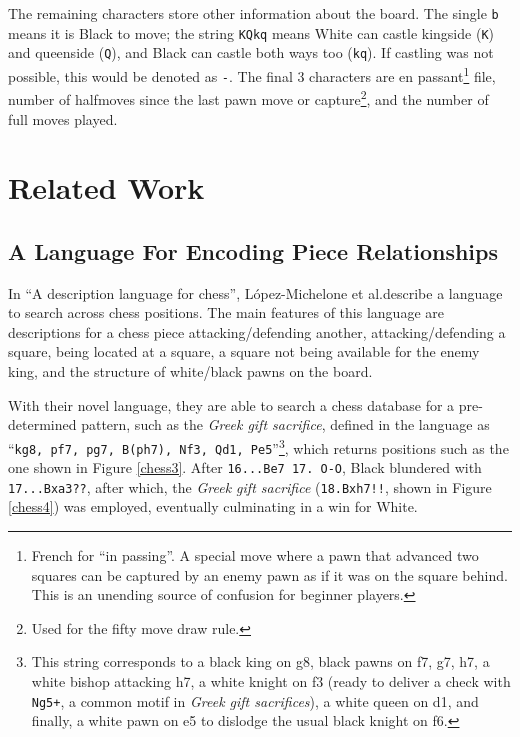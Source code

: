 The remaining characters store other information about the board. The single
\texttt{b} means it is Black to move; the string \texttt{KQkq} means White can
castle kingside (\texttt{K}) and queenside (\texttt{Q}), and Black can castle
both ways too (\texttt{kq}). If castling was not possible, this would be
denoted as \texttt{-}. The final 3 characters are en passant\footnote{French
for ``in passing''. A special move where a pawn that advanced two squares can
be captured by an enemy pawn as if it was on the square behind. This is an
unending source of confusion for beginner players.} file, number of halfmoves
since the last pawn move or capture\footnote{Used for the fifty move draw
rule.}, and the number of full moves played.

\section{Related Work}

\subsection{A Language For Encoding Piece Relationships}

In ``A description language for chess'',\cite{chessLanguage} López-Michelone et
al.\@ describe a language to search across chess positions. The main features
of this language are descriptions for a chess piece attacking/defending
another, attacking/defending a square, being located at a square, a square not
being available for the enemy king, and the structure of white/black pawns on
the board.

With their novel language, they are able to search a chess database for a
pre-determined pattern, such as the \emph{Greek gift sacrifice}, defined in the
language as ``\texttt{kg8, pf7, pg7, B(ph7), Nf3, Qd1, Pe5}''\footnote{This
string corresponds to a black king on g8, black pawns on f7, g7, h7, a white
bishop attacking h7, a white knight on f3 (ready to deliver a check with
\texttt{Ng5+}, a common motif in \emph{Greek gift sacrifices}), a white queen
on d1, and finally, a white pawn on e5 to dislodge the usual black knight on
f6.}, which returns positions such as the one shown in Figure \ref{chess3}.
After \texttt{16...Be7 17. O-O}, Black blundered with \texttt{17...Bxa3??},
after which, the \emph{Greek gift sacrifice} (\texttt{18.Bxh7!!}, shown in
Figure \ref{chess4}) was employed, eventually culminating in a win for White.

